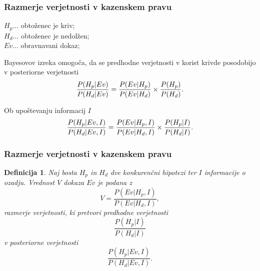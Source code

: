\documentclass{beamer}
\newtheorem{definicija}{Definicija}
\begin{document}
\begin{frame}
    \frametitle{Razmerje verjetnosti v kazenskem pravu}
    $H_p \dots$ obtoženec je kriv;\\
    $H_d \dots$ obtoženec je nedolžen;\\
    $Ev \dots$ obravnavani dokaz;\\
    \begin{block}{Bayesovov izreka omogoča, da se predhodne verjetnosti v korist krivde posodobijo v posteriorne verjetnosti}
        \[
            \frac{P(H_p \lvert Ev)}{P(H_d \lvert Ev)} = \frac{P(Ev \lvert H_p)}{P(Ev \lvert H_d)} \times \frac{P(H_p)}{P(H_d)}. \vspace{2mm}
        \]
    \end{block}\vspace{2mm}
    \begin{block}{Ob upoštevanju informacij $I$}
        \[
            \frac{P(H_p \lvert Ev, I)}{P(H_d \lvert Ev, I)} = \frac{P(Ev \lvert H_p, I)}{P(Ev \lvert H_d, I)} \times \frac{P(H_p \lvert I)}{P(H_d \lvert I)}. \vspace{2mm}
        \]
    \end{block}
\end{frame}

\begin{frame}
    \frametitle{Razmerje verjetnosti v kazenskem pravu}
    \begin{definicija}
        Naj bosta  $H_p$ in $H_d$ dve konkurenčni hipotezi ter $I$ informacije o ozadju. Vrednost $V$ dokaza $Ev$ je podana z
        \[
            V = \frac{P(Ev \lvert H_p, I)}{P(Ev \lvert H_d, I)},
        \]
        razmerje verjetnosti, ki pretvori predhodne verjetnosti
        \[
            \frac{P(H_p \lvert I)}{P(H_d \lvert I)} 
        \]
        v posteriorne verjetnosti
        \[
            \frac{P(H_p \lvert Ev, I)}{P(H_d \lvert Ev, I)}.
        \]
     \end{definicija}     
\end{frame}
\end{document}
